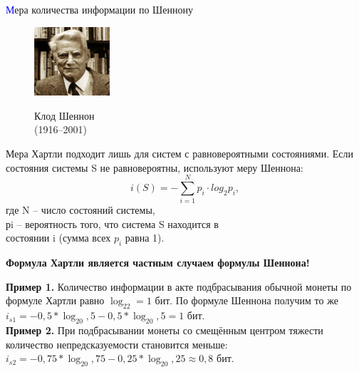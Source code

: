 \begin{frame}[t]{\textcolor{blue}{М}ера количества информации по Шеннону}
\small
\begin{figure}
	\vskip -1cm
	\includegraphics[width=2.8cm]{shannon.png}
	\begin{center}
		\vskip -0.3cm
		Клод Шеннон\\
		(1916--2001)
	\end{center}
\end{figure}
\noindent Мера Хартли подходит лишь для систем с равновероятными состояниями.
Если состояния системы S не равновероятны, используют меру Шеннона:
$$i(S)=-\sum_{i=1}^Np_i\cdot log_2p_i,$$
где N – число состояний системы,\\
\noindent рi – вероятность того, что система S находится в\\
состоянии i (сумма всех $p_i$ равна 1).
\vspace{0.2cm}
\begin{center}
	\color[rgb]{0,0.7,0.4}
	\textbf{Формула Хартли является частным случаем формулы Шеннона!}
	\color{black}
\end{center}
\noindent\textbf{Пример 1.} Количество информации в акте подбрасывания обычной монеты по формуле Хартли равно $\log_22=1$ бит. По формуле Шеннона получим то же $i_{s1}=-0,5*\log_20,5-0,5*\log_20,5=1$ бит.\\
\noindent\textbf{Пример 2.} При подбрасывании монеты со смещённым центром тяжести количество непредсказуемости становится меньше: $i_{s2}=-0,75*\log_20,75-0,25*\log_20,25\approx0,8$ бит.
\end{frame}